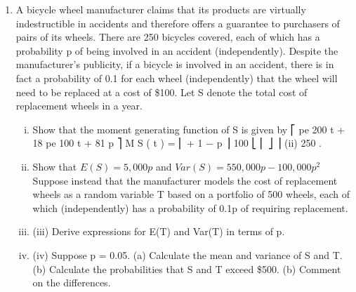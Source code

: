 \documentclass[a4paper,12pt]{article}
\begin{document}
\begin{enumerate}
\item A bicycle wheel manufacturer claims that its products are virtually indestructible in accidents and therefore offers a guarantee to purchasers of pairs of its wheels. There
are 250 bicycles covered, each of which has a probability p of being involved in an accident (independently). Despite the manufacturer’s publicity, if a bicycle is
involved in an accident, there is in fact a probability of 0.1 for each wheel (independently) that the wheel will need to be replaced at a cost of \$100. Let S denote
the total cost of replacement wheels in a year.

\begin{enumerate}[(i)]
\item Show that the moment generating function of S is given by
⎡ pe 200 t + 18 pe 100 t + 81 p
⎤
M S ( t ) = ⎢
+ 1 − p ⎥
100
⎣ ⎢
⎦ ⎥
(ii)
250
.
\item Show that $E ( S ) = 5, 000 p$ and $Var ( S ) = 550, 000 p − 100, 000 p^2$
Suppose instead that the manufacturer models the cost of replacement wheels as a random variable T based on a portfolio of 500 wheels, each of which (independently) has a probability of 0.1p of requiring replacement.
\item (iii) Derive expressions for E(T) and Var(T) in terms of p.
\item (iv) Suppose p = 0.05.
(a) Calculate the mean and variance of S and T.
(b) Calculate the probabilities that S and T exceed \$500.
(b) Comment on the differences.



\end{enumerate}
\end{enumerate}
\end{document}

